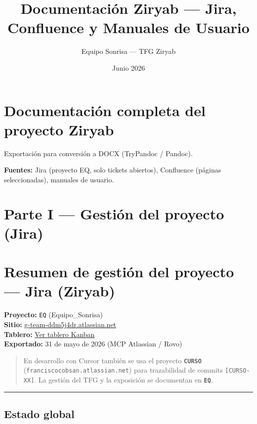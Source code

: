 \documentclass[
  spanish,
  11pt,
]{report}
\title{Documentación Ziryab --- Jira, Confluence y Manuales de Usuario}
\author{Equipo Sonrisa --- TFG Ziryab}
\date{Junio 2026}
\begin{document}
\maketitle

{
\setcounter{tocdepth}{2}
\tableofcontents
}
\chapter{Documentación completa del proyecto
Ziryab}\label{documentaciuxf3n-completa-del-proyecto-ziryab}

Exportación para conversión a DOCX (TryPandoc / Pandoc).

\textbf{Fuentes:} Jira (proyecto EQ, solo tickets abiertos), Confluence
(páginas seleccionadas), manuales de usuario.

\chapter{Parte I --- Gestión del proyecto
(Jira)}\label{parte-i-gestiuxf3n-del-proyecto-jira}

\chapter{Resumen de gestión del proyecto --- Jira
(Ziryab)}\label{resumen-de-gestiuxf3n-del-proyecto-jira-ziryab}

\textbf{Proyecto:} \texttt{EQ} (Equipo\_Sonrisa)\\
\textbf{Sitio:}
\href{https://g-team-ddm5j4dr.atlassian.net/jira/software/projects/EQ/boards}{g-team-ddm5j4dr.atlassian.net}\\
\textbf{Tablero:}
\href{https://g-team-ddm5j4dr.atlassian.net/jira/software/projects/EQ/boards}{Ver
tablero Kanban}\\
\textbf{Exportado:} 31 de mayo de 2026 (MCP Atlassian / Rovo)

\begin{quote}
En desarrollo con Cursor también se usa el proyecto
\textbf{\texttt{CURSO}} (\texttt{franciscocobsan.atlassian.net}) para
trazabilidad de commits \texttt{{[}CURSO-XX{]}}. La gestión del TFG y la
exposición se documentan en \textbf{\texttt{EQ}}.
\end{quote}

\begin{center}\rule{0.5\linewidth}{0.5pt}\end{center}

\section{Estado global}\label{estado-global}
\end{document}
